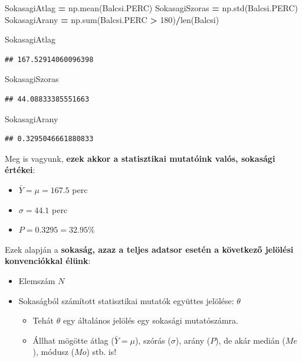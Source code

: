 \documentclass[
]{book}
\newenvironment{Shaded}{\begin{snugshade}}{\end{snugshade}}
\newcommand{\BuiltInTok}[1]{#1}
\newcommand{\DecValTok}[1]{\textcolor[rgb]{0.00,0.00,0.81}{#1}}
\newcommand{\NormalTok}[1]{#1}
\newcommand{\OperatorTok}[1]{\textcolor[rgb]{0.81,0.36,0.00}{\textbf{#1}}}
\providecommand{\tightlist}{%
  \setlength{\itemsep}{0pt}\setlength{\parskip}{0pt}}
\begin{document}
\begin{Shaded}
\begin{Highlighting}[]
\NormalTok{SokasagiAtlag }\OperatorTok{=}\NormalTok{ np.mean(Balcsi.PERC)}
\NormalTok{SokasagiSzoras }\OperatorTok{=}\NormalTok{ np.std(Balcsi.PERC)}
\NormalTok{SokasagiArany }\OperatorTok{=}\NormalTok{ np.}\BuiltInTok{sum}\NormalTok{(Balcsi.PERC }\OperatorTok{\textgreater{}} \DecValTok{180}\NormalTok{)}\OperatorTok{/}\BuiltInTok{len}\NormalTok{(Balcsi)}

\NormalTok{SokasagiAtlag}
\end{Highlighting}
\end{Shaded}

\begin{verbatim}
## 167.52914060096398
\end{verbatim}

\begin{Shaded}
\begin{Highlighting}[]
\NormalTok{SokasagiSzoras}
\end{Highlighting}
\end{Shaded}

\begin{verbatim}
## 44.08833385551663
\end{verbatim}

\begin{Shaded}
\begin{Highlighting}[]
\NormalTok{SokasagiArany}
\end{Highlighting}
\end{Shaded}

\begin{verbatim}
## 0.3295046661880833
\end{verbatim}

Meg is vagyunk, \textbf{ezek akkor a statisztikai mutatóink valós, sokasági értékei}:

\begin{itemize}
\tightlist
\item
  \(\bar{Y}=\mu=167.5\) perc
\item
  \(\sigma = 44.1\) perc
\item
  \(P = 0.3295=32.95\%\)
\end{itemize}

Ezek alapján a \textbf{sokaság, azaz a teljes adatsor esetén a következő jelölési konvenciókkal élünk}:

\begin{itemize}
\tightlist
\item
  Elemszám \(N\)
\item
  Sokaságból számított statisztikai mutatók együttes jelölése: \(\theta\)

  \begin{itemize}
  \tightlist
  \item
    Tehát \(\theta\) egy általános jelölés egy sokasági mutatószámra.
  \item
    Állhat mögötte átlag (\(\bar{Y}=\mu\)), szórás (\(\sigma\)), arány (\(P\)), de akár medián (\(Me\)), módusz (\(Mo\)) stb. is!
  \end{itemize}
\end{itemize}
\end{document}
